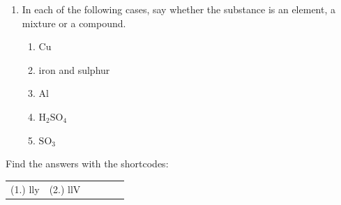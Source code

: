 \begin{enumerate}[noitemsep, label=\textbf{\arabic*}. ]
\begin{table}[H]
\begin{center}
\begin{xtabular}[t]{|l|l|l|}
         &
     \tabularnewline{}
    \end{xtabular}
      \end{center}
    \begin{center}{\small\bfseries Table 1.1}\end{center}
    \begin{caption}{\small\bfseries Table 1.1}\end{caption}
\end{table}
    \par
\label{m38708*uid29}\item In each of the following cases, say whether the substance is an element, a mixture or a compound.
\label{m38708*id63912}\begin{enumerate}[noitemsep, label=\textbf{\alph*}. ] 
            \label{m38708*uid30}\item $\mathrm{Cu}$
\label{m38708*uid31}\item iron and sulphur
\label{m38708*uid32}\item $\mathrm{Al}$
\label{m38708*uid33}\item $\mathrm{H}{}_{2}\mathrm{SO}{}_{4}$\label{m38708*uid34}\item $\mathrm{SO}{}_{3}$\end{enumerate}
                \end{enumerate}
    \label{m38708*cid4}
\par {} Find the answers with the shortcodes:
 \par \begin{tabular}[h]{cccccc}
 (1.) lly  &  (2.) llV  & \end{tabular}
